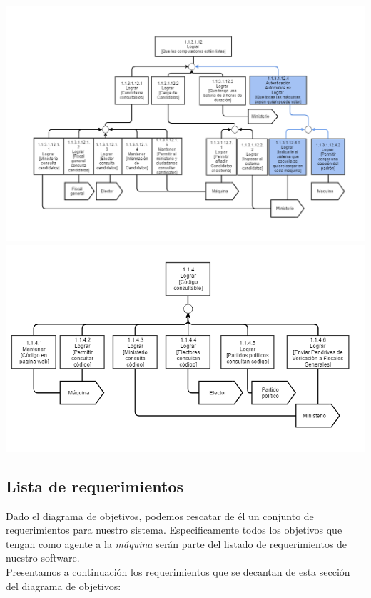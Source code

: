 \includegraphics[scale=0.55]{imagenes/Diagramas/11/113112.png}
\\
\includegraphics[scale=0.55]{imagenes/Diagramas/11/114.png}




\newpage
\subsection{Lista de requerimientos}

Dado el diagrama de objetivos, podemos rescatar de él un conjunto de requerimientos para 
nuestro sistema. Especificamente todos los objetivos que tengan como agente a la 
\textit{máquina} serán parte del listado de requerimientos de nuestro software.\\


Presentamos a continuación los requerimientos que se decantan de esta sección del diagrama de 
objetivos:

